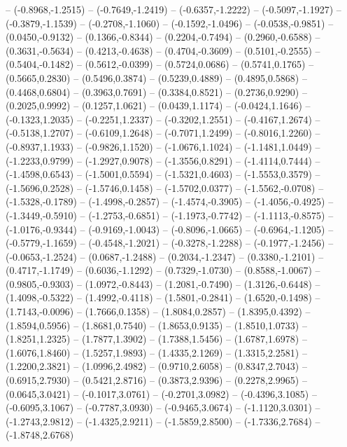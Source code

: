 {	-- (-0.8968,-1.2515)
	-- (-0.7649,-1.2419)
	-- (-0.6357,-1.2222)
	-- (-0.5097,-1.1927)
	-- (-0.3879,-1.1539)
	-- (-0.2708,-1.1060)
	-- (-0.1592,-1.0496)
	-- (-0.0538,-0.9851)
	-- (0.0450,-0.9132)
	-- (0.1366,-0.8344)
	-- (0.2204,-0.7494)
	-- (0.2960,-0.6588)
	-- (0.3631,-0.5634)
	-- (0.4213,-0.4638)
	-- (0.4704,-0.3609)
	-- (0.5101,-0.2555)
	-- (0.5404,-0.1482)
	-- (0.5612,-0.0399)
	-- (0.5724,0.0686)
	-- (0.5741,0.1765)
	-- (0.5665,0.2830)
	-- (0.5496,0.3874)
	-- (0.5239,0.4889)
	-- (0.4895,0.5868)
	-- (0.4468,0.6804)
	-- (0.3963,0.7691)
	-- (0.3384,0.8521)
	-- (0.2736,0.9290)
	-- (0.2025,0.9992)
	-- (0.1257,1.0621)
	-- (0.0439,1.1174)
	-- (-0.0424,1.1646)
	-- (-0.1323,1.2035)
	-- (-0.2251,1.2337)
	-- (-0.3202,1.2551)
	-- (-0.4167,1.2674)
	-- (-0.5138,1.2707)
	-- (-0.6109,1.2648)
	-- (-0.7071,1.2499)
	-- (-0.8016,1.2260)
	-- (-0.8937,1.1933)
	-- (-0.9826,1.1520)
	-- (-1.0676,1.1024)
	-- (-1.1481,1.0449)
	-- (-1.2233,0.9799)
	-- (-1.2927,0.9078)
	-- (-1.3556,0.8291)
	-- (-1.4114,0.7444)
	-- (-1.4598,0.6543)
	-- (-1.5001,0.5594)
	-- (-1.5321,0.4603)
	-- (-1.5553,0.3579)
	-- (-1.5696,0.2528)
	-- (-1.5746,0.1458)
	-- (-1.5702,0.0377)
	-- (-1.5562,-0.0708)
	-- (-1.5328,-0.1789)
	-- (-1.4998,-0.2857)
	-- (-1.4574,-0.3905)
	-- (-1.4056,-0.4925)
	-- (-1.3449,-0.5910)
	-- (-1.2753,-0.6851)
	-- (-1.1973,-0.7742)
	-- (-1.1113,-0.8575)
	-- (-1.0176,-0.9344)
	-- (-0.9169,-1.0043)
	-- (-0.8096,-1.0665)
	-- (-0.6964,-1.1205)
	-- (-0.5779,-1.1659)
	-- (-0.4548,-1.2021)
	-- (-0.3278,-1.2288)
	-- (-0.1977,-1.2456)
	-- (-0.0653,-1.2524)
	-- (0.0687,-1.2488)
	-- (0.2034,-1.2347)
	-- (0.3380,-1.2101)
	-- (0.4717,-1.1749)
	-- (0.6036,-1.1292)
	-- (0.7329,-1.0730)
	-- (0.8588,-1.0067)
	-- (0.9805,-0.9303)
	-- (1.0972,-0.8443)
	-- (1.2081,-0.7490)
	-- (1.3126,-0.6448)
	-- (1.4098,-0.5322)
	-- (1.4992,-0.4118)
	-- (1.5801,-0.2841)
	-- (1.6520,-0.1498)
	-- (1.7143,-0.0096)
	-- (1.7666,0.1358)
	-- (1.8084,0.2857)
	-- (1.8395,0.4392)
	-- (1.8594,0.5956)
	-- (1.8681,0.7540)
	-- (1.8653,0.9135)
	-- (1.8510,1.0733)
	-- (1.8251,1.2325)
	-- (1.7877,1.3902)
	-- (1.7388,1.5456)
	-- (1.6787,1.6978)
	-- (1.6076,1.8460)
	-- (1.5257,1.9893)
	-- (1.4335,2.1269)
	-- (1.3315,2.2581)
	-- (1.2200,2.3821)
	-- (1.0996,2.4982)
	-- (0.9710,2.6058)
	-- (0.8347,2.7043)
	-- (0.6915,2.7930)
	-- (0.5421,2.8716)
	-- (0.3873,2.9396)
	-- (0.2278,2.9965)
	-- (0.0645,3.0421)
	-- (-0.1017,3.0761)
	-- (-0.2701,3.0982)
	-- (-0.4396,3.1085)
	-- (-0.6095,3.1067)
	-- (-0.7787,3.0930)
	-- (-0.9465,3.0674)
	-- (-1.1120,3.0301)
	-- (-1.2743,2.9812)
	-- (-1.4325,2.9211)
	-- (-1.5859,2.8500)
	-- (-1.7336,2.7684)
	-- (-1.8748,2.6768)
}
